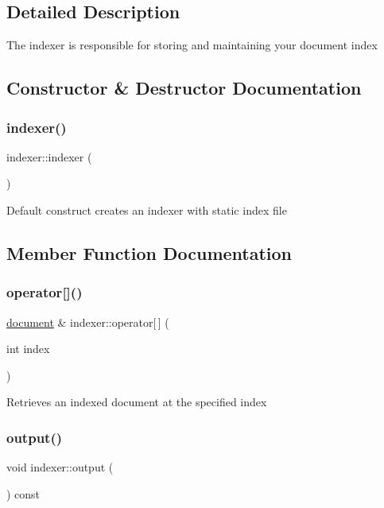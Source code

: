 \subsection{Detailed Description}
The indexer is responsible for storing and maintaining your document index 

\subsection{Constructor \& Destructor Documentation}
\mbox{\label{classindexer_acbbcbad080a7ae43ed78840fcf006960}} 
\subsubsection{\texorpdfstring{indexer()}{indexer()}}
{\footnotesize\ttfamily indexer\+::indexer (\begin{DoxyParamCaption}{ }\end{DoxyParamCaption})}

Default construct creates an indexer with static index file 

\subsection{Member Function Documentation}
\mbox{\label{classindexer_a1ef6a5497d341fdbbae13bb26a66c37a}} 
\subsubsection{\texorpdfstring{operator[]()}{operator[]()}}
{\footnotesize\ttfamily \hyperlink{classdocument}{document} \& indexer\+::operator\mbox{[}$\,$\mbox{]} (\begin{DoxyParamCaption}\item[{int}]{index }\end{DoxyParamCaption})}

Retrieves an indexed document at the specified index \mbox{\label{classindexer_af84f1ddc60859b7d007699ee011abf36}} 
\subsubsection{\texorpdfstring{output()}{output()}}
{\footnotesize\ttfamily void indexer\+::output (\begin{DoxyParamCaption}{ }\end{DoxyParamCaption}) const}

